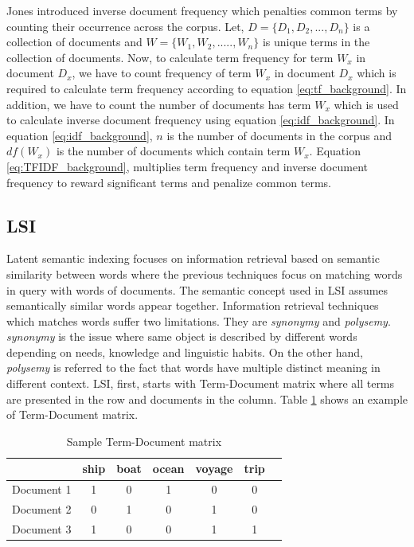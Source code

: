 Jones \cite{jones1972statistical} introduced inverse document frequency which penalties common terms by counting their occurrence across the corpus. Let, $D = \{D_1, D_2, ..., D_n\}$ is a collection of documents and $W = \{W_1, W_2, ....., W_n\}$ is unique terms in the collection of documents. Now, to calculate term frequency for term $W_x$ in document $D_x$, we have to count frequency of term $W_x$ in  document $D_x$ which is required to calculate term frequency according to equation \ref{eq:tf_background}. In addition, we have to count the number of documents has term $W_x$ which is used to calculate inverse document frequency using equation \ref{eq:idf_background}. In equation \ref{eq:idf_background}, $n$ is the number of documents in the corpus and $df(W_x)$ is the number of documents which contain term $W_x$. Equation \ref{eq:TFIDF_background}, multiplies term frequency and inverse document frequency to reward significant terms and penalize common terms. 



\subsection{LSI}
Latent semantic indexing focuses on information retrieval based on semantic similarity between words where the previous techniques focus on matching words in query with words of documents. The semantic concept used in LSI assumes semantically similar words appear together. Information retrieval techniques which matches words suffer two limitations. They are \emph{synonymy} and \emph{polysemy}. \emph{synonymy} is the issue where same object is described by different words depending on needs, knowledge and linguistic habits. On the other hand, \emph{polysemy} is referred to the fact that words have multiple distinct meaning in different context. LSI, first, starts with Term-Document matrix where all terms are presented in the row and documents in the column. Table \ref{tb:LSI_term_document} shows an example of Term-Document matrix. 

\begin{table}[h]
    \centering
    \caption{Sample Term-Document matrix}
 \begin{tabular}{|c|c|c|c|c|c|c|}
    \hline
    
        & ship & boat & ocean & voyage & trip   \\
        \hline
        Document 1 & 1 & 0 & 1 & 0 & 0  \\
        Document 2 & 0 & 1 & 0 & 1 & 0    \\
        Document 3 & 1 & 0 & 0 & 1 & 1  \\
    \hline
    \end{tabular}
    
    \label{tb:LSI_term_document}
\end{table}


